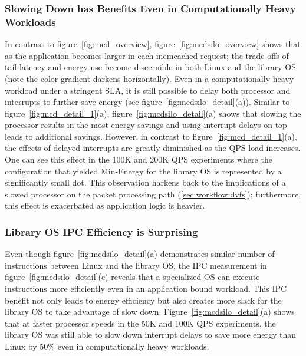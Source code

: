 \subsubsection{Slowing Down has Benefits Even in Computationally Heavy Workloads}
\label{sec:mcdsilo:dvfstradeoff}
In contrast to figure~\ref{fig:mcd_overview}, figure~\ref{fig:mcdsilo_overview} shows that as the application becomes larger in each memcached request; the trade-offs of tail latency and energy use become discernible in both Linux and the library OS (note the color gradient darkens horizontally).
Even in a computationally heavy workload under a stringent SLA, it is still possible to delay both processor and interrupts to further save energy (see figure~\ref{fig:mcdsilo_detail}(a)). Similar to figure~\ref{fig:mcd_detail_1}(a), figure~\ref{fig:mcdsilo_detail}(a) shows that slowing the processor results in the most energy savings and using interrupt delays on top leads to additional savings. However, in contrast to figure~\ref{fig:mcd_detail_1}(a), the effects of delayed interrupts are greatly diminished as the QPS load increases.
One can see this effect in the 100K and 200K QPS experiments where the configuration that yielded Min-Energy for the library OS is represented by a significantly small dot. This observation harkens back to the implications of a slowed processor on the packet processing path (\cref{sec:workflow:dvfs}); furthermore, this effect is exacerbated as application logic is heavier.

\subsubsection{Library OS IPC Efficiency is Surprising}
\label{sec:mcdsilo:ipc}
Even though figure~\ref{fig:mcdsilo_detail}(a) demonstrates similar number of instructions between Linux and the library OS, the IPC measurement in figure~\ref{fig:mcdsilo_detail}(c) reveals that a specialized OS can execute instructions more efficiently even in an application bound workload. This IPC benefit not only leads to energy efficiency but also creates more slack for the library OS to take advantage of slow down. Figure~\ref{fig:mcdsilo_detail}(a) shows that at faster processor speeds in the 50K and 100K QPS experiments, the library OS was still able to slow down interrupt delays to save more energy than Linux by 50\% even in computationally heavy workloads.


